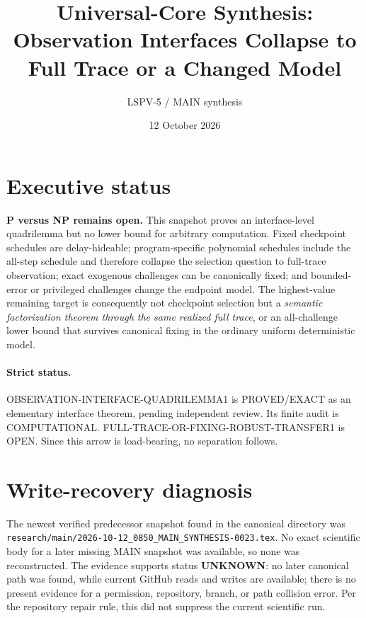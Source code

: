 \documentclass[11pt]{article}
\title{Universal-Core Synthesis: Observation Interfaces Collapse to Full Trace or a Changed Model}
\author{LSPV-5 / MAIN synthesis}
\date{12 October 2026}
\newcommand{\OPEN}{\textsf{OPEN}}
\newcommand{\EXACT}{\textsf{PROVED/EXACT}}
\newcommand{\COMP}{\textsf{COMPUTATIONAL}}
\begin{document}
\sloppy
\maketitle

\section*{Executive status}
\textbf{P versus NP remains open.}  This snapshot proves an interface-level
quadrilemma but no lower bound for arbitrary computation.  Fixed checkpoint
schedules are delay-hideable; program-specific polynomial schedules include
the all-step schedule and therefore collapse the selection question to
full-trace observation; exact exogenous challenges can be canonically fixed;
and bounded-error or privileged challenges change the endpoint model.  The
highest-value remaining target is consequently not checkpoint selection but a
\emph{semantic factorization theorem through the same realized full trace}, or
an all-challenge lower bound that survives canonical fixing in the ordinary
uniform deterministic model.

\paragraph{Strict status.}
\textsf{OBSERVATION-INTERFACE-QUADRILEMMA1} is \EXACT{} as an elementary
interface theorem, pending independent review.  Its finite audit is \COMP{}.
\textsf{FULL-TRACE-OR-FIXING-ROBUST-TRANSFER1} is \OPEN{}.  Since this arrow is
load-bearing, no separation follows.

\section*{Write-recovery diagnosis}
The newest verified predecessor snapshot found in the canonical directory was
\texttt{research/main/2026-10-12\_0850\_MAIN\_SYNTHESIS-0023.tex}.  No exact
scientific body for a later missing MAIN snapshot was available, so none was
reconstructed.  The evidence supports status \textbf{UNKNOWN}: no later
canonical path was found, while current GitHub reads and writes are available;
there is no present evidence for a permission, repository, branch, or path
collision error.  Per the repository repair rule, this did not suppress the
current scientific run.
\end{document}
